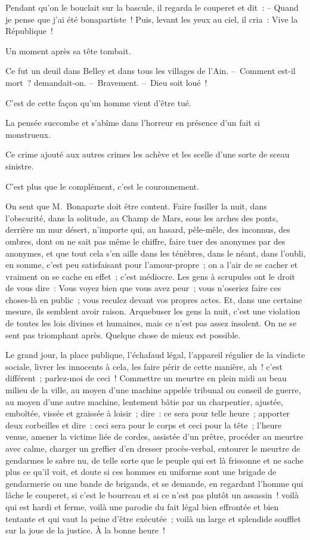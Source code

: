 \documentclass[french,twoside]{book} %
\begin{document}
Pendant qu’on le bouclait sur la bascule, il regarda le couperet et dit : – Quand je pense que j’ai été bonapartiste ! Puis, levant les yeux au ciel, il cria : Vive la République !\par
Un moment après sa tête tombait.\par
Ce fut un deuil dans Belley et dans tous les villages de l’Ain. – Comment est-il mort ? demandait-on. – Bravement. – Dieu soit loué !\par
C’est de cette façon qu’un homme vient d’être tué.\par
La pensée succombe et s’abîme dans l’horreur en présence d’un fait si monstrueux.\par
Ce crime ajouté aux autres crimes les achève et les scelle d’une sorte de sceau sinistre.\par
C’est plus que le complément, c’est le couronnement.\par
On sent que M. Bonaparte doit être content. Faire fusiller la nuit, dans l’obscurité, dans la solitude, au Champ de Mars, sous les arches des ponts, derrière un mur désert, n’importe qui, au hasard, pêle-mêle, des inconnus, des ombres, dont on ne sait pas même le chiffre, faire tuer des anonymes par des anonymes, et que tout cela s’en aille dans les ténèbres, dans le néant, dans l’oubli, en somme, c’est peu satisfaisant pour l’amour-propre ; on a l’air de se cacher et vraiment on se cache en effet ; c’est médiocre. Les gens à scrupules ont le droit de vous dire : Vous voyez bien que vous avez peur ; vous n’oseriez faire ces choses-là en public ; vous reculez devant vos propres actes. Et, dans une certaine mesure, ils semblent avoir raison. Arquebuser les gens la nuit, c’est une violation de toutes les lois divines et humaines, mais ce n’est pas assez insolent. On ne se sent pas triomphant après. Quelque chose de mieux est possible.\par
Le grand jour, la place publique, l’échafaud légal, l’appareil régulier de la vindicte sociale, livrer les innocents à cela, les faire périr de cette manière, ah ! c’est différent ; parlez-moi de ceci ! Commettre un meurtre en plein midi au beau milieu de la ville, au moyen d’une machine appelée tribunal ou conseil de guerre, au moyen d’une autre machine, lentement bâtie par un charpentier, ajustée, emboîtée, vissée et graissée à loisir ; dire : ce sera pour telle heure ; apporter deux corbeilles et dire : ceci sera pour le corps et ceci pour la tête ; l’heure venue, amener la victime liée de cordes, assistée d’un prêtre, procéder au meurtre avec calme, charger un greffier d’en dresser procès-verbal, entourer le meurtre de gendarmes le sabre nu, de telle sorte que le peuple qui est là frissonne et ne sache plus ce qu’il voit, et doute si ces hommes en uniforme sont une brigade de gendarmerie ou une bande de brigands, et se demande, en regardant l’homme qui lâche le couperet, si c’est le bourreau et si ce n’est pas plutôt un assassin ! voilà qui est hardi et ferme, voilà une parodie du fait légal bien effrontée et bien tentante et qui vaut la peine d’être exécutée ; voilà un large et splendide soufflet sur la joue de la justice. À la bonne heure !\par
\end{document}
